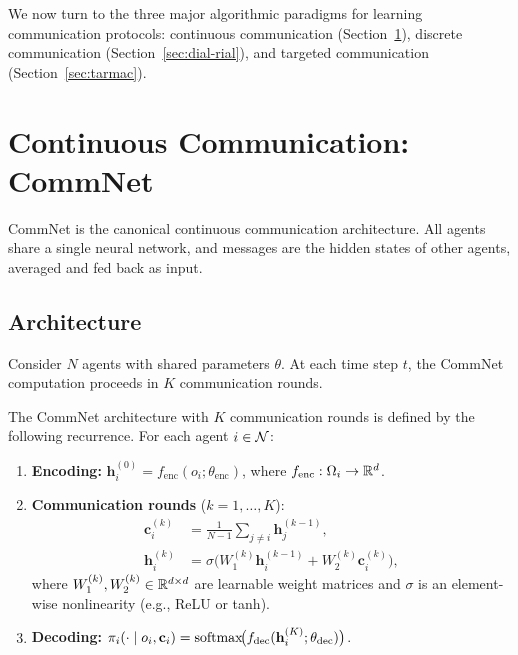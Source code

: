 \documentclass[11pt,a4paper]{article}
\begin{document}
We now turn to the three major algorithmic paradigms for learning
communication protocols: continuous communication (Section~\ref{sec:commnet}),
discrete communication (Section~\ref{sec:dial-rial}), and
targeted communication (Section~\ref{sec:tarmac}).

\section{Continuous Communication: CommNet}
\label{sec:commnet}

CommNet \citep{sukhbaatar2016} is the canonical continuous
communication architecture.  All agents share a single neural
network, and messages are the hidden states of other agents,
averaged and fed back as input.

\subsection{Architecture}

Consider $N$ agents with shared parameters $\theta$.  At each
time step $t$, the CommNet computation proceeds in $K$
communication rounds.

\begin{definition}[CommNet]
\label{def:commnet}
The CommNet architecture with $K$ communication rounds is defined
by the following recurrence.  For each agent $i \in \mathcal{N}$:
\begin{enumerate}[nosep]
  \item \textbf{Encoding:}
    $\mathbf{h}_i^{(0)} = f_{\mathrm{enc}}(o_i; \theta_{\mathrm{enc}})$,
    where $f_{\mathrm{enc}} : \Omega_i \to \mathbb{R}^d$.
  \item \textbf{Communication rounds} ($k = 1, \ldots, K$):
    \begin{align}
      \mathbf{c}_i^{(k)} &= \frac{1}{N-1} \sum_{j \neq i}
        \mathbf{h}_j^{(k-1)},
        \label{eq:commnet-msg} \\
      \mathbf{h}_i^{(k)} &= \sigma\!\bigl(W_1^{(k)}
        \mathbf{h}_i^{(k-1)} + W_2^{(k)}
        \mathbf{c}_i^{(k)}\bigr),
        \label{eq:commnet-update}
    \end{align}
    where $W_1^{(k)}, W_2^{(k)} \in \mathbb{R}^{d \times d}$ are
    learnable weight matrices and $\sigma$ is an element-wise
    nonlinearity (e.g., ReLU or tanh).
  \item \textbf{Decoding:}
    $\pi_i(\cdot \mid o_i, \mathbf{c}_i) =
    \mathrm{softmax}\!\bigl(f_{\mathrm{dec}}(\mathbf{h}_i^{(K)};
    \theta_{\mathrm{dec}})\bigr)$.
\end{enumerate}
\end{definition}
\end{document}
